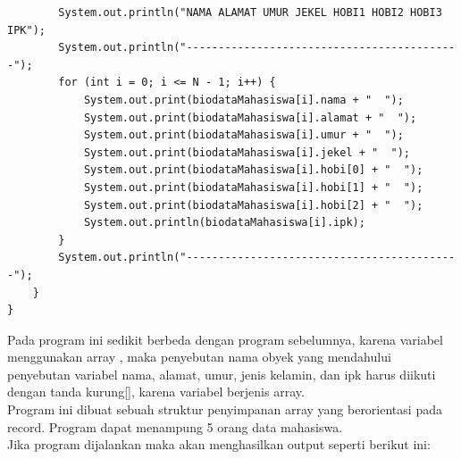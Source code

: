 \documentclass[a4paper,12pt]{article}
\begin{document}
\begin{lstlisting}
        System.out.println("NAMA ALAMAT UMUR JEKEL HOBI1 HOBI2 HOBI3 IPK");
        System.out.println("-------------------------------------------");
        for (int i = 0; i <= N - 1; i++) {
            System.out.print(biodataMahasiswa[i].nama + "  ");
            System.out.print(biodataMahasiswa[i].alamat + "  ");
            System.out.print(biodataMahasiswa[i].umur + "  ");
            System.out.print(biodataMahasiswa[i].jekel + "  ");
            System.out.print(biodataMahasiswa[i].hobi[0] + "  ");
            System.out.print(biodataMahasiswa[i].hobi[1] + "  ");
            System.out.print(biodataMahasiswa[i].hobi[2] + "  ");
            System.out.println(biodataMahasiswa[i].ipk);
        }
        System.out.println("-------------------------------------------");
    }
}
\end{lstlisting}
Pada program ini sedikit berbeda dengan program sebelumnya, karena variabel menggunakan array , maka penyebutan nama
obyek yang mendahului penyebutan variabel nama, alamat, umur, jenis kelamin, dan ipk harus diikuti dengan tanda
kurung[], karena variabel berjenis array.\\
Program ini dibuat sebuah struktur penyimpanan array yang berorientasi pada record. Program dapat menampung 5 orang
data mahasiswa.\\
Jika program dijalankan maka akan menghasilkan output seperti berikut ini:
\end{document}
